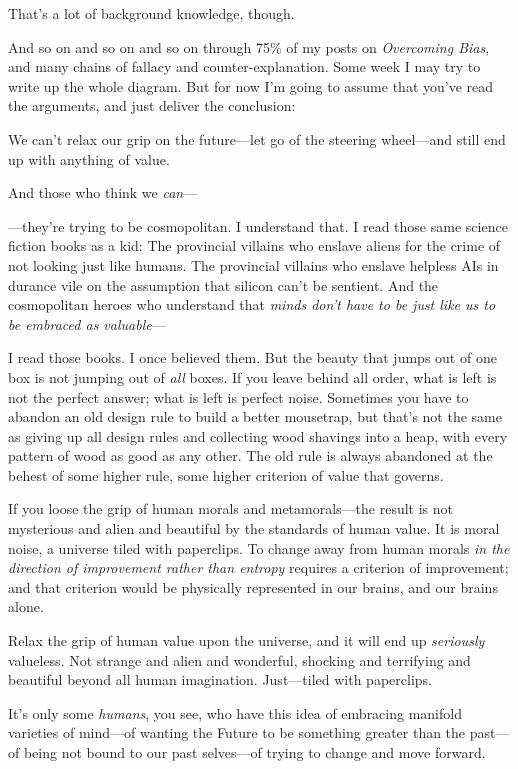 {
 That's a lot of background knowledge, though.}

{
 And so on and so on and so on through 75\% of my posts on
\textit{Overcoming Bias}, and many chains of fallacy and
counter-explanation. Some week I may try to write up the whole diagram.
But for now I'm going to assume that
you've read the arguments, and just deliver the
conclusion:}

{
 We can't relax our grip on the future---let go of
the steering wheel---and still end up with anything of value.}

{
 And those who think we \textit{can}{}---}

{
 {}---they're trying to be cosmopolitan. I
understand that. I read those same science fiction books as a kid: The
provincial villains who enslave aliens for the crime of not looking
just like humans. The provincial villains who enslave helpless AIs in
durance vile on the assumption that silicon can't be
sentient. And the cosmopolitan heroes who understand that \textit{minds
don't have to be just like us to be embraced as
valuable}{}---}

{
 I read those books. I once believed them. But the beauty that
jumps out of one box is not jumping out of \textit{all} boxes. If you
leave behind all order, what is left is not the perfect answer; what is
left is perfect noise. Sometimes you have to abandon an old design rule
to build a better mousetrap, but that's not the same as
giving up all design rules and collecting wood shavings into a heap,
with every pattern of wood as good as any other. The old rule is always
abandoned at the behest of some higher rule, some higher criterion of
value that governs.}

{
 If you loose the grip of human morals and metamorals---the result
is not mysterious and alien and beautiful by the standards of human
value. It is moral noise, a universe tiled with paperclips. To change
away from human morals \textit{in the direction of improvement rather
than entropy} requires a criterion of improvement; and that criterion
would be physically represented in our brains, and our brains alone.}

{
 Relax the grip of human value upon the universe, and it will end
up \textit{seriously} valueless. Not strange and alien and wonderful,
shocking and terrifying and beautiful beyond all human imagination.
Just---tiled with paperclips.}

{
 It's only some \textit{humans}, you see, who have
this idea of embracing manifold varieties of mind---of wanting the
Future to be something greater than the past---of being not bound to
our past selves---of trying to change and move forward.}

